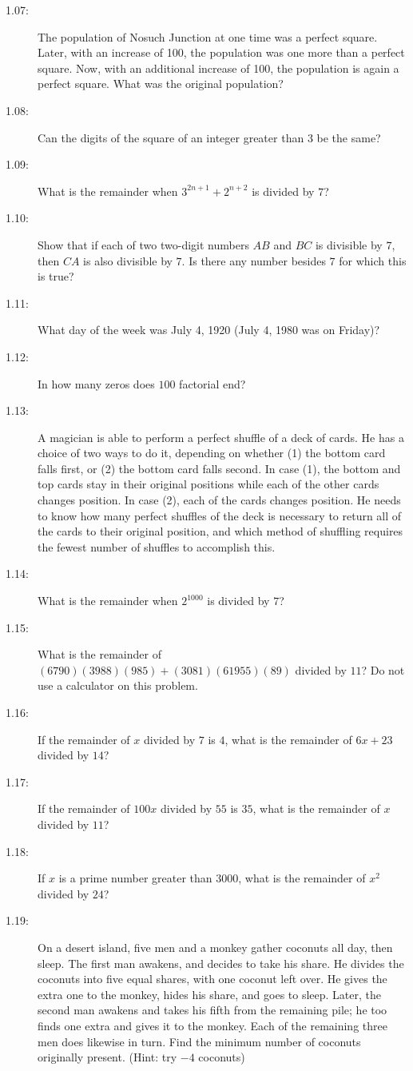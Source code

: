 \documentclass{article}
\begin{document}
\begin{description}
\begin{description}
      \item[1.07:] The population of Nosuch Junction at one time was a perfect square. Later, with an increase of 100, the population was one more than a perfect square. Now, with an additional increase of 100, the population is again a perfect square. What was the original population?
      \item[1.08:] Can the digits of the square of an integer greater than $3$ be the same?
      \item[1.09:] What is the remainder when $3^{2n+1}+2^{n+2}$ is divided by $7$?
      \item[1.10:] Show that if each of two two-digit numbers $AB$ and $BC$ is divisible by $7$, then $CA$ is also divisible by $7$. Is there any number besides $7$ for which this is true?
      \item[1.11:] What day of the week was July 4, 1920 (July 4, 1980 was on Friday)?
      \item[1.12:] In how many zeros does $100$ factorial end?
      \item[1.13:] A magician is able to perform a perfect shuffle of a deck of cards. He has a choice of two ways to do it, depending on whether (1) the bottom card falls first, or (2) the bottom card falls second. In case (1), the bottom and top cards stay in their original positions while each of the other cards changes position. In case (2), each of the cards changes position. He needs to know how many perfect shuffles of the deck is necessary to return all of the cards to their original position, and which method of shuffling requires the fewest number of shuffles to accomplish this.
      \item[1.14:] What is the remainder when $2^{1000}$ is divided by $7$?
      \item[1.15:] What is the remainder of $(6790)(3988)(985) + (3081)(61955)(89)$ divided by $11$? Do not use a calculator on this problem.
      \item[1.16:] If the remainder of $x$ divided by $7$ is $4$, what is the remainder of $6x+23$ divided by $14$?
      \item[1.17:] If the remainder of $100x$ divided by $55$ is $35$, what is the remainder of $x$ divided by $11$?
      \item[1.18:] If $x$ is a prime number greater than $3000$, what is the remainder of $x^2$ divided by $24$?
      \item[1.19:] On a desert island, five men and a monkey gather coconuts all day, then sleep. The first man awakens, and decides to take his share. He divides the coconuts into five equal shares, with one coconut left over. He gives the extra one to the monkey, hides his share, and goes to sleep. Later, the second man awakens and takes his fifth from the remaining pile; he too finds one extra and gives it to the monkey. Each of the remaining three men does likewise in turn. Find the minimum number of coconuts originally present. (Hint: try $-4$ coconuts)

\end{description}
\end{description}
\end{document}
